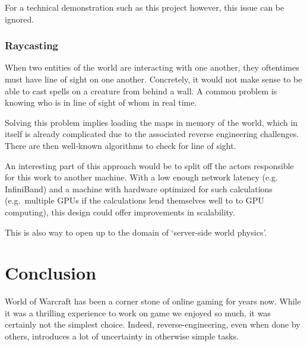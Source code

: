 \documentclass[paper=a4, fontsize=11pt]{scrartcl}
\begin{document}
For a technical demonstration such as this project however, this issue can be
ignored.

\subsubsection{Raycasting}

When two entities of the world are interacting with one another, they oftentimes 
must have line of sight on one another.
Concretely, it would not make sense to be able to cast spells on a creature from
behind a wall.
A common problem is knowing who is in line of sight of whom in real time.

Solving this problem implies loading the maps in memory of the world, which in
itself is already complicated due to the associated reverse engineering
challenges.
There are then well-known algorithms to check for line of sight.

An interesting part of this approach would be to split off the actors
responsible for this work to another machine. With a low enough network latency
(e.g. InfiniBand) and a machine with hardware optimized for such
calculations (e.g.\ multiple GPUs if the calculations lend themselves well to
to GPU computing), this design could offer improvements in scalability.

This is also way to open up to the domain of `server-side world physics'.


\section{Conclusion}


World of Warcraft has been a corner stone of online gaming for years now.
While it was a thrilling experience to work on game we enjoyed so much, it was
certainly not the simplest choice.
Indeed, reverse-engineering, even when done by others, introduces a lot of
uncertainty in otherwise simple tasks.
\end{document}

